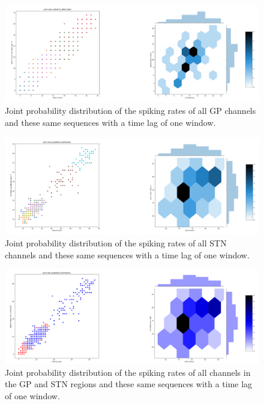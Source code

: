 \documentclass{article}
\begin{document}
\begin{figure}[H]
    \centering
    \centerline{\includegraphics[width=1\textwidth]{images/spiking/JP_gp.png}}
    \caption{Joint probability distribution of the spiking rates of all GP channels and these same sequences with a time lag of one window. }
    \label{fig:JP1}
\end{figure}

\begin{figure}[H]
    \centering
    \centerline{\includegraphics[width=1\textwidth]{images/spiking/JP_stn.png}}
    \caption{Joint probability distribution of the spiking rates of all STN channels and these same sequences with a time lag of one window.}
    \label{fig:JP2}
\end{figure}

\begin{figure}[H]
    \centering
    \centerline{\includegraphics[width=1\textwidth]{images/spiking/JP_all.png}}
    \caption{Joint probability distribution of the spiking rates of all channels in the GP and STN regions and these same sequences with a time lag of one window.}
    \label{fig:JP3}
\end{figure}
\end{document}
